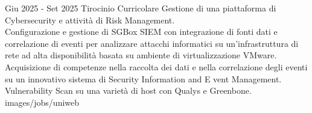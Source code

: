 {Giu 2025 - Set 2025}
{Tirocinio Curricolare}
{Gestione di una piattaforma di Cybersecurity e attività di Risk Management.\\
Configurazione e gestione di SGBox SIEM con integrazione di fonti dati e 
correlazione di eventi per analizzare attacchi informatici su 
un'infrastruttura di rete ad alta disponibilità basata su ambiente 
di virtualizzazione VMware.
Acquisizione di competenze nella raccolta dei dati e nella correlazione 
degli eventi su un innovativo sistema di Security Information and E
vent Management.
Vulnerability Scan su una varietà di host con Qualys e Greenbone.}
{images/jobs/uniweb}
